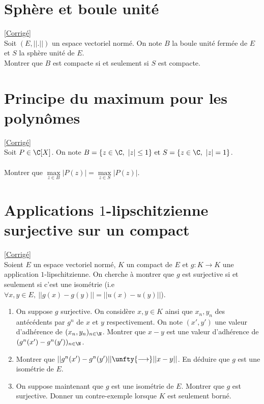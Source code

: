 \documentclass{book}
\begin{document}
\section{Sphère et boule unité }
\label{Sphère et boule unité}
\textcolor{blue}{\hyperref[sec:sphere-et-boule-unite-etoile3]{[Corrigé]}}\\
Soit $(E,||.||)$ un espace vectoriel normé. On note $B$ la boule unité fermée de $E$ et $S$ la sphère unité de $E$.\\
Montrer que $B$ est compacte si et seulement si $S$ est compacte.

\section{Principe du maximum pour les polynômes }
\label{Principe du maximum pour les polynômes}
\textcolor{blue}{\hyperref[sec:principe-du-maximum-pour-les-polynomes]{[Corrigé]}}\\
Soit $P\in \C[X]$. On note $B=\{z\in \C,\ |z|\leq 1\}\text{ et }S=\{z\in \C,\ |z|=1\}$.\\\\
Montrer que $\max\limits_{z\in B}{|P(z)|}=\max\limits_{z\in S}{|P(z)|}$.

\section{Applications $1$-lipschitzienne surjective sur un compact }
\label{Applications 1-lipschitzienne sujective sur un compact}
\textcolor{blue}{\hyperref[sec:applications-1-lipschitzienne-surjective-sur-un-compact]{[Corrigé]}}\\
Soient $E$ un espace vectoriel normé, $K$ un compact de $E$ et $g:K\to K$ une application $1$-lipschitzienne. On cherche à montrer que $g$ est surjective si et seulement si c'est une isométrie (i.e $\forall x,y\in E,\ ||g(x)-g(y)||=||u(x)-u(y)||$).
\begin{enumerate}[leftmargin=*]
	\item On suppose $g$ surjective. On considère $x,y\in K$ ainsi que $x_n,y_n$ des antécédents par $g^n$ de $x$ et $y$ respectivement. On note $(x',y')$ une valeur d'adhérence de $(x_n,y_n)_{n\in \N}$. Montrer que $x-y$ est une valeur d'adhérence de $(g^n(x')-g^n(y'))_{n\in \N}$.
	\item Montrer que $||g^n(x')-g^n(y')||\unfty{\longrightarrow}||x-y||$. En déduire que $g$ est une isométrie de $E$.
	\item On suppose maintenant que $g$ est une isométrie de $E$. Montrer que $g$ est surjective. Donner un contre-exemple lorsque $K$ est seulement borné.
\end{enumerate}
\end{document}

